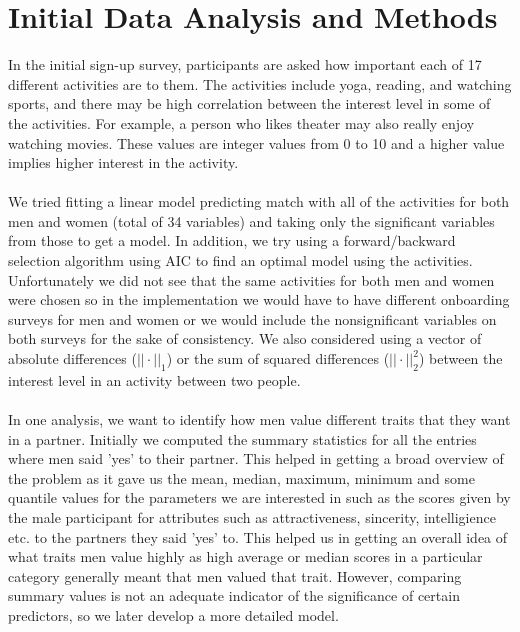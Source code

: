 \documentclass{article}
\begin{document}
\section{Initial Data Analysis and Methods}
In the initial sign-up survey, participants are asked how important each of 17 different activities are to them.  The activities include yoga, reading, and watching sports, and there may be high correlation between the interest level in some of the activities.  For example, a person who likes theater may also really enjoy watching movies.  These values are integer values from 0 to 10 and a higher value implies higher interest in the activity. \\ %
\null\\
We tried fitting a linear model predicting match with all of the activities for both men and women (total of 34 variables) and taking only the significant variables from those to get a model.  In addition, we try using a forward/backward selection algorithm using AIC to find an optimal model using the activities.  Unfortunately we did not see that the same activities for both men and women were chosen so in the implementation we would have to have different onboarding surveys for men and women or we would include the nonsignificant variables on both surveys for the sake of consistency.  We also considered using a vector of absolute differences ($||\cdot||_1$) or the sum of squared differences ($||\cdot||_2^2$) between the interest level in an activity between two people. \\
\null\\
In one analysis, we want to identify how men value different traits that they want in a partner. Initially we computed the summary statistics for all the entries where men said 'yes' to their partner. This helped in getting a broad overview of the problem as it gave us the mean, median, maximum, minimum and some quantile values for the parameters we are interested in such as the scores given by the male participant for attributes such as attractiveness, sincerity, intelligience etc. to the partners they said 'yes' to. This helped us in getting an overall idea of what traits men value highly as high average or median scores in a particular category generally meant that men valued that trait. However, comparing summary values is not an adequate indicator of the significance of certain predictors, so we later develop a more detailed model. \\
\end{document}
